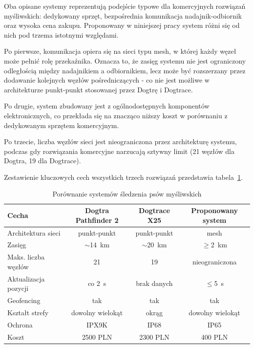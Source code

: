 Oba opisane systemy reprezentują podejście typowe dla komercyjnych rozwiązań myśliwskich:
dedykowany sprzęt, bezpośrednia komunikacja nadajnik-odbiornik oraz wysoka cena zakupu.
Proponowany w niniejszej pracy system różni się od nich pod trzema istotnymi względami.

Po pierwsze, komunikacja opiera się na sieci typu mesh, w której każdy węzeł może pełnić
rolę przekaźnika. Oznacza to, że zasięg systemu nie jest ograniczony odległością między
nadajnikiem a odbiornikiem, lecz może być rozszerzany przez dodawanie kolejnych węzłów
pośredniczących - co nie jest możliwe w architekturze punkt-punkt stosowanej przez Dogtrę
i Dogtrace.

Po drugie, system zbudowany jest z ogólnodostępnych komponentów elektronicznych, co 
przekłada się na znacząco niższy koszt w porównaniu z dedykowanym sprzętem komercyjnym.

Po trzecie, liczba węzłów sieci jest nieograniczona przez architekturę systemu, podczas gdy
rozwiązania komercyjne narzucają sztywny limit (21 węzłów dla Dogtra, 19 dla Dogtrace).

Zestawienie kluczowych cech wszystkich trzech rozwiązań przedstawia tabela~\ref{tab:porownanie}.

\begin{table}[!h]
    \caption{Porównanie systemów śledzenia psów myśliwskich}
    \label{tab:porownanie}
    \centering
    \begin{tabular}{|l|c|c|c|}
        \hline
        \textbf{Cecha} & \textbf{Dogtra Pathfinder 2} & \textbf{Dogtrace X25} & \textbf{Proponowany system} \\
        \hline
        Architektura sieci      & punkt-punkt & punkt-punkt & mesh \\
        Zasięg                  & $\sim$14~km & $\sim$20~km & $\geq$2~km\footnotemark[1] \\
        Maks. liczba węzłów     & 21          & 19          & nieograniczona\footnotemark[2] \\
        Aktualizacja pozycji    & co 2~s      & brak danych & $\leq$5~s \\
        Geofencing              & tak         & tak         & tak \\
        Kształt strefy          & dowolny wielokąt & okrąg  & dowolny wielokąt \\
        Ochrona                 & IPX9K       & IP68        & IP65 \\
        Koszt                   & 2500 PLN    & 2300 PLN    & 400 PLN\footnotemark[3] \\
        \hline
    \end{tabular}
\end{table}
